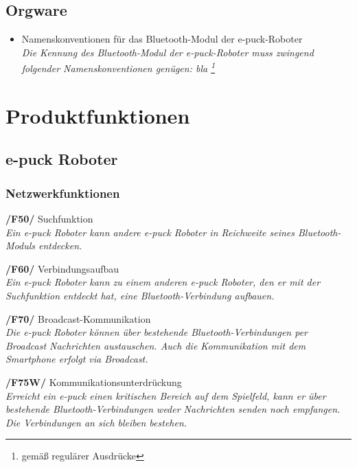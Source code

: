 \documentclass[10pt,a4paper]{article}
\let\oldsection\section
\renewcommand{\section}{\newpage \oldsection}
\begin{document}
		\subsection{Orgware}
			\begin{itemize}
				\item Namenskonventionen für das Bluetooth-Modul der e-puck-Roboter
					\\ \textsl{Die Kennung des Bluetooth-Modul der e-puck-Roboter muss zwingend folgender Namenskonventionen
						genügen: bla \footnote{gemäß regulärer Ausdrücke}  }
			\end{itemize}		
	\section{Produktfunktionen}
		\subsection{e-puck Roboter}
			\subsubsection{Netzwerkfunktionen}
				\begin{list}{}{\leftmargin=1cm}
					\item[\textbf{/F50/}] Suchfunktion
						\\ \textsl{Ein e-puck Roboter kann andere e-puck Roboter in Reichweite seines Bluetooth-Moduls entdecken.}
					\item[\textbf{/F60/}] Verbindungsaufbau
						\\ \textsl{Ein e-puck Roboter kann zu einem anderen e-puck Roboter, den er mit der Suchfunktion entdeckt
						hat, eine Bluetooth-Verbindung aufbauen.}
					\item[\textbf{/F70/}] Broadcast-Kommunikation
						\\ \textsl{Die e-puck Roboter können über bestehende Bluetooth-Verbindungen per Broadcast
						Nachrichten austauschen. Auch die Kommunikation mit dem Smartphone erfolgt via Broadcast.}
					\item[\textbf{/F75W/}] Kommunikationsunterdrückung
						\\ \textsl{Erreicht ein e-puck einen kritischen Bereich auf dem Spielfeld, kann er über bestehende
						Bluetooth-Verbindungen weder Nachrichten senden noch empfangen. Die Verbindungen an sich bleiben bestehen.}
				\end{list}
\end{document}
